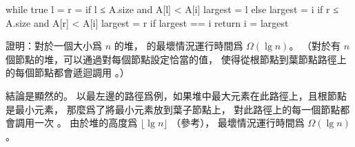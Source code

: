 \startANSWER
{}
\startCLRSCODE
while true
	l = 
	r = 
	if l ≤ A.size and A[l] < A[i]
		largest = l
	else
		largest = i
	if r ≤ A.size and A[r] < A[i]
		largest = r
	if largest == i
		return
	i = largest
\stopCLRSCODE
\stopANSWER

\blank

\startEXERCISE
證明：對於一個大小爲 $n$ 的堆，  的最壞情況運行時間爲 $\Omega(\lg{n})$。
（\hint 對於有 $n$ 個節點的堆，可以通過對每個節點設定恰當的值，
使得從根節點到葉節點路徑上的每個節點都會遞迴調用 。）
\stopEXERCISE

\startANSWER
結論是顯然的。
以最左邊的路徑爲例，如果堆中最大元素在此路徑上，且根節點是最小元素，
那麼爲了將最小元素放到葉子節點上，
對此路徑上的每一個節點都會調用一次 。
由於堆的高度爲 $\lfloor \lg{n} \rfloor$ （參考），
最壞情況運行時間爲 $\Omega(\lg{n})$。
\stopANSWER

\stopsection
